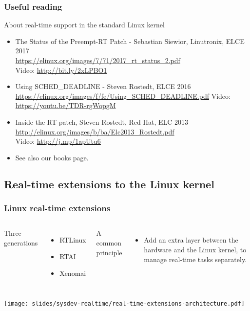 \begin{frame}
  \frametitle{Useful reading}
  About real-time support in the standard Linux kernel
  \begin{itemize}
  \item The Status of the Preempt-RT Patch - Sebastian Siewior, Linutronix, ELCE 2017\\
	\url{https://elinux.org/images/7/71/2017_rt_status_2.pdf}\\
	Video: \url{http://bit.ly/2xLPBO1}
  \item Using SCHED\_DEADLINE - Steven Rostedt, ELCE 2016\\
	{\small \url{https://elinux.org/images/f/fe/Using_SCHED_DEADLINE.pdf}}
	Video: \url{https://youtu.be/TDR-rgWopgM}
  \item Inside the RT patch, Steven Rostedt, Red Hat, ELC 2013\\
    	\url{http://elinux.org/images/b/ba/Elc2013_Rostedt.pdf}\\
    	Video: \url{http://j.mp/1apUtu6}
  \item See also our books page.
  \end{itemize}
\end{frame}

\subsection{Real-time extensions to the Linux kernel}

\begin{frame}
  \frametitle{Linux real-time extensions}
  \begin{columns}
    Three generations
    \begin{itemize}
    \item RTLinux
    \item RTAI
    \item Xenomai
    \end{itemize}
    A common principle
    \begin{itemize}
    \item Add an extra layer between the hardware and the Linux kernel, to manage
      real-time tasks separately.
    \end{itemize}
  \end{columns}
  \begin{center}
    \texttt{[image: slides/sysdev-realtime/real-time-extensions-architecture.pdf]}
  \end{center}
\end{frame}

